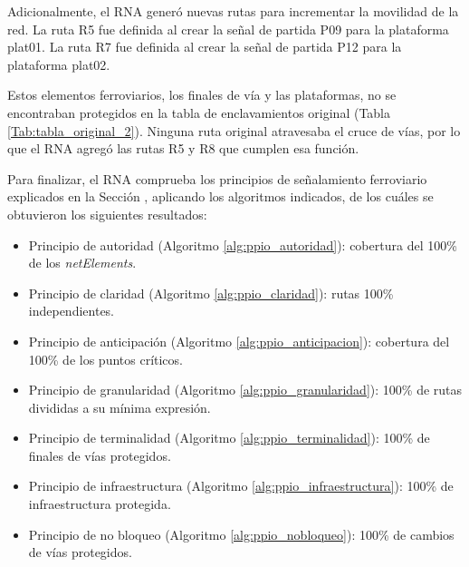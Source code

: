     Adicionalmente, el RNA generó nuevas rutas para incrementar la movilidad de la red. La ruta R5 fue definida al crear la señal de partida P09 para la plataforma plat01. La ruta R7 fue definida al crear la señal de partida P12 para la plataforma plat02.
    
    Estos elementos ferroviarios, los finales de vía y las plataformas, no se encontraban protegidos en la tabla de enclavamientos original (Tabla \ref{Tab:tabla_original_2}). Ninguna ruta original atravesaba el cruce de vías, por lo que el RNA agregó las rutas R5 y R8 que cumplen esa función.
    
    Para finalizar, el RNA comprueba los principios de señalamiento ferroviario explicados en la Sección \label{sec:validar_principios}, aplicando los algoritmos indicados, de los cuáles se obtuvieron los siguientes resultados:
    
    \begin{itemize}
    	\item Principio de autoridad (Algoritmo \ref{alg:ppio_autoridad}): cobertura del 100\% de los \textit{netElements}.
    	\item Principio de claridad (Algoritmo \ref{alg:ppio_claridad}): rutas 100\% independientes.
    	\item Principio de anticipación (Algoritmo \ref{alg:ppio_anticipacion}): cobertura del 100\% de los puntos críticos.
    	\item Principio de granularidad (Algoritmo \ref{alg:ppio_granularidad}): 100\% de rutas divididas a su mínima expresión.
    	\item Principio de terminalidad (Algoritmo \ref{alg:ppio_terminalidad}): 100\% de finales de vías protegidos.
    	\item Principio de infraestructura (Algoritmo \ref{alg:ppio_infraestructura}): 100\% de infraestructura protegida.
    	\item Principio de no bloqueo (Algoritmo \ref{alg:ppio_nobloqueo}): 100\% de cambios de vías protegidos.
    \end{itemize}	